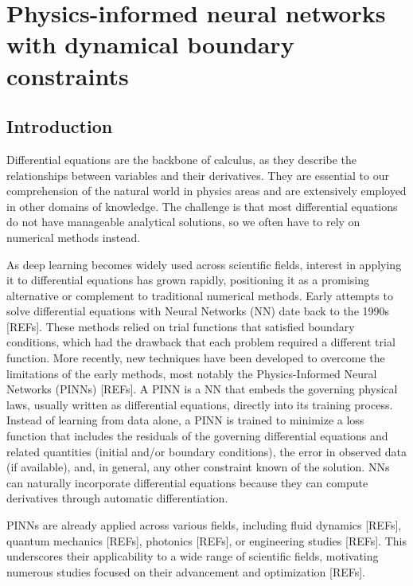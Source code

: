 \chapter{Physics-informed neural networks with dynamical boundary constraints}
\nopagebreak
\label{chap:chapter_3}
\thispagestyle{empty}


\section{Introduction}\label{sec:dbc_intro}

Differential equations are the backbone of calculus, as they describe the relationships between variables and their derivatives. They are essential to our comprehension of the natural world in physics areas and are extensively employed in other domains of knowledge. The challenge is that most differential equations do not have manageable analytical solutions, so we often have to rely on numerical methods instead.

As deep learning becomes widely used across scientific fields, interest in applying it to differential equations has grown rapidly, positioning it as a promising alternative or complement to traditional numerical methods. Early attempts to solve differential equations with Neural Networks (NN) date back to the 1990s [REFs]. These methods relied on trial functions that satisfied boundary conditions, which had the drawback that each problem required a different trial function. More recently, new techniques have been developed to overcome the limitations of the early methods, most notably the Physics-Informed Neural Networks (PINNs) [REFs]. A PINN is a NN that embeds the governing physical laws, usually written as differential equations, directly into its training process. Instead of learning from data alone, a PINN is trained to minimize a loss function that includes the residuals of the governing differential equations and related quantities (initial and/or boundary conditions), the error in observed data (if available), and, in general, any other constraint known of the solution. NNs can naturally incorporate differential equations because they can compute derivatives through automatic differentiation.

PINNs are already applied across various fields, including fluid dynamics [REFs], quantum mechanics [REFs], photonics [REFs], or engineering studies [REFs]. This underscores their applicability to a wide range of scientific fields, motivating numerous studies focused on their advancement and optimization [REFs].

